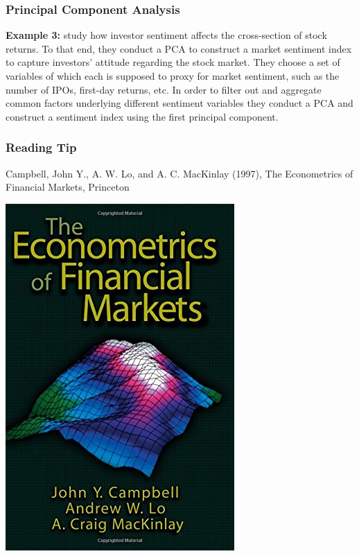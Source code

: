 \documentclass[xcolor=dvipsnames, english, 8pt]{beamer}
\begin{document}
\begin{frame}
    \frametitle{Principal Component Analysis}
\textbf{Example 3:} \cite{Baker2006} study how investor sentiment affects the cross-section of stock returns. To that end, they conduct a PCA to construct a market sentiment index to capture investors' attitude regarding the stock market. They choose a set of variables of which each is supposed to proxy for market sentiment, such as the number of IPOs, first-day returns, etc. In order to filter out and aggregate common factors underlying different sentiment variables they conduct a PCA and construct a sentiment index using the first principal component.\\

\end{frame}


\begin{frame}
    \frametitle{Reading Tip}
Campbell, John Y., A. W. Lo, and A. C. MacKinlay (1997), The Econometrics of Financial Markets, Princeton\vspace{0.35cm}\\
\begin{center}

    \includegraphics[scale=0.35]{Campbell}
\end{center}
\end{frame}
\end{document}
